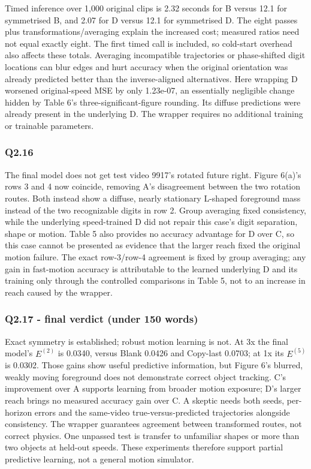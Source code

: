 \documentclass[
  10pt,
  a4paper,
]{article}
\begin{document}
Timed inference over 1,000 original clips is 2.32 seconds for B versus
12.1 for symmetrised B, and 2.07 for D versus 12.1 for symmetrised D.
The eight passes plus transformations/averaging explain the increased
cost; measured ratios need not equal exactly eight. The first timed call
is included, so cold-start overhead also affects these totals. Averaging
incompatible trajectories or phase-shifted digit locations can blur
edges and hurt accuracy when the original orientation was already
predicted better than the inverse-aligned alternatives. Here wrapping D
worsened original-speed MSE by only 1.23e-07, an essentially negligible
change hidden by Table 6's three-significant-figure rounding. Its
diffuse predictions were already present in the underlying D. The
wrapper requires no additional training or trainable parameters.

\subsubsection{Q2.16}\label{q2.16}

The final model does not get test video 9917's rotated future right.
Figure 6(a)'s rows 3 and 4 now coincide, removing A's disagreement
between the two rotation routes. Both instead show a diffuse, nearly
stationary L-shaped foreground mass instead of the two recognizable
digits in row 2. Group averaging fixed consistency, while the underlying
speed-trained D did not repair this case's digit separation, shape or
motion. Table 5 also provides no accuracy advantage for D over C, so
this case cannot be presented as evidence that the larger reach fixed
the original motion failure. The exact row-3/row-4 agreement is fixed by
group averaging; any gain in fast-motion accuracy is attributable to the
learned underlying D and its training only through the controlled
comparisons in Table 5, not to an increase in reach caused by the
wrapper.

\subsubsection{Q2.17 - final verdict (under 150
words)}\label{q2.17---final-verdict-under-150-words}

Exact symmetry is established; robust motion learning is not. At 3x the
final model's \(E^{(2)}\) is 0.0340, versus Blank 0.0426 and Copy-last
0.0703; at 1x its \(E^{(5)}\) is 0.0302. Those gains show useful
predictive information, but Figure 6's blurred, weakly moving foreground
does not demonstrate correct object tracking. C's improvement over A
supports learning from broader motion exposure; D's larger reach brings
no measured accuracy gain over C. A skeptic needs both seeds,
per-horizon errors and the same-video true-versus-predicted trajectories
alongside consistency. The wrapper guarantees agreement between
transformed routes, not correct physics. One unpassed test is transfer
to unfamiliar shapes or more than two objects at held-out speeds. These
experiments therefore support partial predictive learning, not a general
motion simulator.
\end{document}
